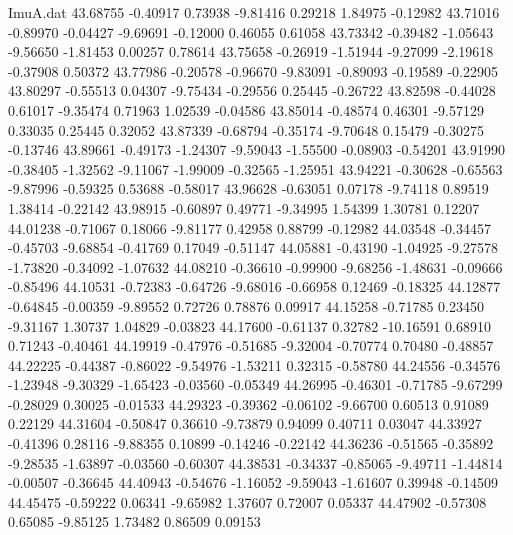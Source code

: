 \begin{filecontents}{ImuA.dat}
  43.68755   -0.40917    0.73938   -9.81416    0.29218    1.84975   -0.12982
  43.71016   -0.89970   -0.04427   -9.69691   -0.12000    0.46055    0.61058
  43.73342   -0.39482   -1.05643   -9.56650   -1.81453    0.00257    0.78614
  43.75658   -0.26919   -1.51944   -9.27099   -2.19618   -0.37908    0.50372
  43.77986   -0.20578   -0.96670   -9.83091   -0.89093   -0.19589   -0.22905
  43.80297   -0.55513    0.04307   -9.75434   -0.29556    0.25445   -0.26722
  43.82598   -0.44028    0.61017   -9.35474    0.71963    1.02539   -0.04586
  43.85014   -0.48574    0.46301   -9.57129    0.33035    0.25445    0.32052
  43.87339   -0.68794   -0.35174   -9.70648    0.15479   -0.30275   -0.13746
  43.89661   -0.49173   -1.24307   -9.59043   -1.55500   -0.08903   -0.54201
  43.91990   -0.38405   -1.32562   -9.11067   -1.99009   -0.32565   -1.25951
  43.94221   -0.30628   -0.65563   -9.87996   -0.59325    0.53688   -0.58017
  43.96628   -0.63051    0.07178   -9.74118    0.89519    1.38414   -0.22142
  43.98915   -0.60897    0.49771   -9.34995    1.54399    1.30781    0.12207
  44.01238   -0.71067    0.18066   -9.81177    0.42958    0.88799   -0.12982
  44.03548   -0.34457   -0.45703   -9.68854   -0.41769    0.17049   -0.51147
  44.05881   -0.43190   -1.04925   -9.27578   -1.73820   -0.34092   -1.07632
  44.08210   -0.36610   -0.99900   -9.68256   -1.48631   -0.09666   -0.85496
  44.10531   -0.72383   -0.64726   -9.68016   -0.66958    0.12469   -0.18325
  44.12877   -0.64845   -0.00359   -9.89552    0.72726    0.78876    0.09917
  44.15258   -0.71785    0.23450   -9.31167    1.30737    1.04829   -0.03823
  44.17600   -0.61137    0.32782  -10.16591    0.68910    0.71243   -0.40461
  44.19919   -0.47976   -0.51685   -9.32004   -0.70774    0.70480   -0.48857
  44.22225   -0.44387   -0.86022   -9.54976   -1.53211    0.32315   -0.58780
  44.24556   -0.34576   -1.23948   -9.30329   -1.65423   -0.03560   -0.05349
  44.26995   -0.46301   -0.71785   -9.67299   -0.28029    0.30025   -0.01533
  44.29323   -0.39362   -0.06102   -9.66700    0.60513    0.91089    0.22129
  44.31604   -0.50847    0.36610   -9.73879    0.94099    0.40711    0.03047
  44.33927   -0.41396    0.28116   -9.88355    0.10899   -0.14246   -0.22142
  44.36236   -0.51565   -0.35892   -9.28535   -1.63897   -0.03560   -0.60307
  44.38531   -0.34337   -0.85065   -9.49711   -1.44814   -0.00507   -0.36645
  44.40943   -0.54676   -1.16052   -9.59043   -1.61607    0.39948   -0.14509
  44.45475   -0.59222    0.06341   -9.65982    1.37607    0.72007    0.05337
  44.47902   -0.57308    0.65085   -9.85125    1.73482    0.86509    0.09153

\end{filecontents}
